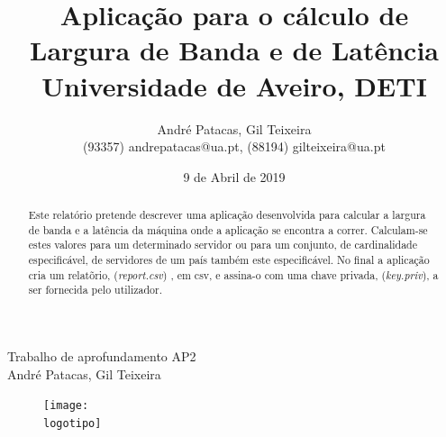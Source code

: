 \documentclass{report}
\begin{document}
%

\def\titulo{Trabalho de aprofundamento AP2}
\def\data{9 de Abril de 2019}
\def\autores{André Patacas, Gil Teixeira}
\def\autorescontactos{(93357) andrepatacas@ua.pt, (88194) gilteixeira@ua.pt}
\def\departamento{Universidade de Aveiro, DETI}
\def\logotipo{ua.pdf}
%
%
\begin{titlepage}

\begin{center}
%
\vspace*{50mm}
%
{\Huge \titulo}\\ 
%
\vspace{10mm}
%
{\LARGE \autores}\\ 
%
\vspace{30mm}
%
\begin{figure}[h]
\center
\texttt{[image: \\logotipo]}
\end{figure}
%
\vspace{30mm}
\end{center}
%
\begin{flushright}

\end{flushright}
\end{titlepage}

\title{%
{\Huge\textbf{Aplicação para o cálculo de Largura de Banda e de Latência}}\\
{\Large \departamento}
}
%
\author{%
    \autores \\
    \autorescontactos 
}

%
\date{\data}
%
\maketitle







\tableofcontents
\listoftables 
\listoffigures  

\clearpage
{}

\begin{abstract}
Este relatório pretende descrever uma aplicação desenvolvida para calcular a largura de banda e a latência da máquina onde a aplicação se encontra a correr. Calculam-se estes valores para um determinado servidor ou para um conjunto, de cardinalidade especificável, de servidores de um país também este especificável. No final a aplicação cria um relatõrio, (\textit{report.csv}) , em csv, e assina-o com uma chave privada, (\textit{key.priv}), a ser fornecida pelo utilizador.
\end{abstract}
\end{document}
